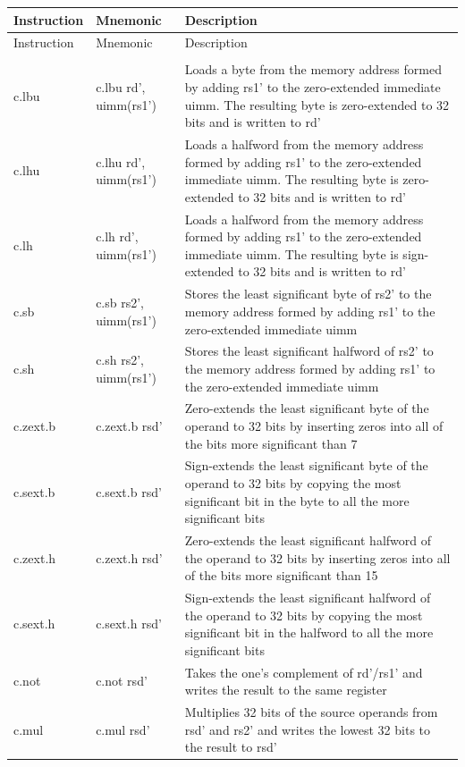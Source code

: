 \documentclass[main\_\_EN.tex]{subfiles}
\begin{document}
\begin{longtable}{ | p{2.0cm} | p{4.0cm} |  p{10.0cm} | }
\hline\rowcolor{lightgray}
Instruction & Mnemonic & Description  \\ \hline
\endfirsthead
\hline
\rowcolor{lightgray}
Instruction & Mnemonic & Description  \\ \hline
\hline
\endhead
\endfoot

\multicolumn{3}{|l|}{\textbf{Zcb extension}} \\\hline
c.lbu & c.lbu rd', uimm(rs1') & Loads a byte from the memory address formed by adding rs1' to the zero-extended immediate uimm. The resulting byte is zero-extended to 32 bits and is written to rd' \\\hline
c.lhu & c.lhu rd', uimm(rs1') &  Loads a halfword from the memory address formed by adding rs1' to the zero-extended immediate uimm. The resulting byte is zero-extended to 32 bits and is written to rd'\\\hline
c.lh & c.lh rd', uimm(rs1') & Loads a halfword from the memory address formed by adding rs1' to the zero-extended immediate uimm. The resulting byte is sign-extended to 32 bits and is written to rd' \\\hline
c.sb & c.sb rs2', uimm(rs1') & Stores the least significant byte of rs2' to the memory address formed by adding rs1' to the zero-extended immediate uimm \\\hline
c.sh & c.sh rs2', uimm(rs1') &  Stores the least significant halfword of rs2' to the memory address formed by adding rs1' to the zero-extended immediate uimm \\\hline
c.zext.b & c.zext.b rsd' & Zero-extends the least significant byte of the operand to 32 bits by inserting zeros into all of the bits more significant than 7 \\\hline
c.sext.b & c.sext.b rsd' & Sign-extends the least significant byte of the operand to 32 bits by copying the most significant bit in the byte to all the more significant bits   \\\hline
c.zext.h & c.zext.h rsd' &  Zero-extends the least significant halfword of the operand to 32 bits by inserting zeros into all of the bits more significant than 15 \\\hline
c.sext.h  & c.sext.h rsd'  &  Sign-extends the least significant halfword of the operand to 32 bits by copying the most significant bit in the halfword to all the more significant bits \\\hline
c.not & c.not rsd' & Takes the one's complement of rd'/rs1' and writes the result to the same register \\\hline
c.mul & c.mul rsd' & Multiplies 32 bits of the source operands from rsd' and rs2' and writes the lowest 32 bits to the result to rsd'\\\hline


\end{longtable}
\end{document}
